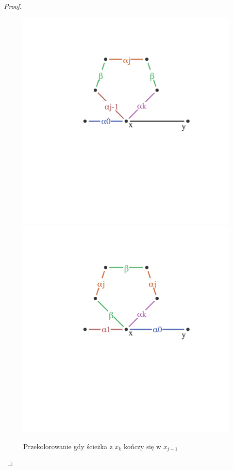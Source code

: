 \begin{proof}
\begin{enumerate}
            
            \begin{figure}[H]
                \centering
                \includegraphics[scale=0.45]{chapters/dyskretna/colours/vizing/images/fan_case_three_before.png}
                \includegraphics[scale=0.45]{chapters/dyskretna/colours/vizing/images/fan_case_three_after.png}
                \caption{Przekolorowanie gdy ścieżka z $x_k$ kończy się w $x_{j-1}$}
            \end{figure}
            
        \end{enumerate}
        
        
        
    \end{proof}